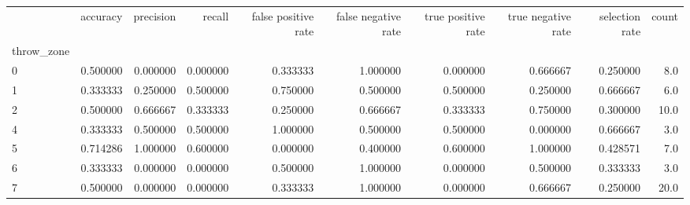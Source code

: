\begin{tabular}{lrrrrrrrrr}
\toprule
{} &  accuracy &  precision &    recall &  false positive rate &  false negative rate &  true positive rate &  true negative rate &  selection rate &  count \\
throw\_zone &           &            &           &                      &                      &                     &                     &                 &        \\
\midrule
0          &  0.500000 &   0.000000 &  0.000000 &             0.333333 &             1.000000 &            0.000000 &            0.666667 &        0.250000 &    8.0 \\
1          &  0.333333 &   0.250000 &  0.500000 &             0.750000 &             0.500000 &            0.500000 &            0.250000 &        0.666667 &    6.0 \\
2          &  0.500000 &   0.666667 &  0.333333 &             0.250000 &             0.666667 &            0.333333 &            0.750000 &        0.300000 &   10.0 \\
4          &  0.333333 &   0.500000 &  0.500000 &             1.000000 &             0.500000 &            0.500000 &            0.000000 &        0.666667 &    3.0 \\
5          &  0.714286 &   1.000000 &  0.600000 &             0.000000 &             0.400000 &            0.600000 &            1.000000 &        0.428571 &    7.0 \\
6          &  0.333333 &   0.000000 &  0.000000 &             0.500000 &             1.000000 &            0.000000 &            0.500000 &        0.333333 &    3.0 \\
7          &  0.500000 &   0.000000 &  0.000000 &             0.333333 &             1.000000 &            0.000000 &            0.666667 &        0.250000 &   20.0 \\
\bottomrule
\end{tabular}
